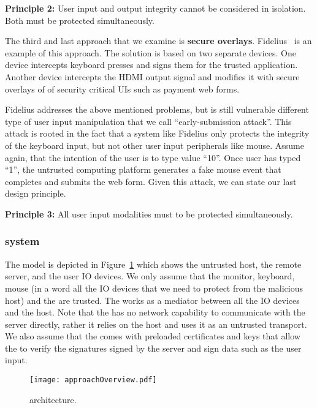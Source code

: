 \begin{tcolorbox}
\textbf{Principle 2:} User input and output integrity cannot be considered in isolation. Both must be protected simultaneously.
\end{tcolorbox}

The third and last approach that we examine is \textbf{secure overlays}. Fidelius~\cite{Fidelius} is an example of this approach. The solution is based on two separate devices. One device intercepts keyboard presses and signs them for the trusted application. Another device intercepts the HDMI output signal and modifies it with secure overlays of of security critical UIs such as payment web forms. 

Fidelius addresses the above mentioned problems, but is still vulnerable different type of user input manipulation that we call ``early-submission attack''. This attack is rooted in the fact that a system like Fidelius only protects the integrity of the keyboard input, but not other user input peripherals like mouse. Assume again, that the intention of the user is to type value ``10''. Once user has typed ``1'', the untrusted computing platform generates a fake mouse event that completes and submits the web form. Given this attack, we can state our last design principle.

\begin{tcolorbox}
\textbf{Principle 3:} All user input modalities must to be protected simultaneously.
\end{tcolorbox}


\subsubsection*{\protection system}

The model is depicted in Figure~\ref{fig:approachOverview} which shows the untrusted host, the remote server, and the user IO devices. We only assume that the monitor, keyboard, mouse (in a word all the IO devices that we need to protect from the malicious host) and the \protection are trusted. The \protection works as a mediator between all the IO devices and the host. Note that the \protection has no network capability to communicate with the server directly, rather it relies on the host and uses it as an untrusted transport. We also assume that the \protection comes with preloaded certificates and keys that allow the \protection to verify the signatures signed by the server and sign data such as the user input.

\begin{figure}[t]
	\centering
	\texttt{[image: approachOverview.pdf]}
	\caption{\protection architecture.}
	\label{fig:approachOverview}
\end{figure}

